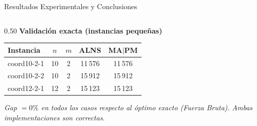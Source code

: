 \documentclass[aspectratio=169,10pt]{beamer}
\begin{document}
\begin{frame}{Resultados Experimentales y Conclusiones}
  \begin{columns}[T,onlytextwidth]
    \begin{column}{0.50\textwidth}
      \textbf{Validación exacta (instancias pequeñas)}
      \vspace{0.25em}
      \begin{center}\footnotesize
      \begin{tabular}{lcccc}
        \toprule
        Instancia & $n$ & $m$ & ALNS & MA$|$PM \\
        \midrule
        coord10-2-1 & 10 & 2
          & \cellcolor{green!20}11\,576
          & \cellcolor{green!20}11\,576 \\
        coord10-2-2 & 10 & 2
          & \cellcolor{green!20}15\,912
          & \cellcolor{green!20}15\,912 \\
        coord12-2-1 & 12 & 2
          & \cellcolor{green!20}15\,123
          & \cellcolor{green!20}15\,123 \\
        \bottomrule
      \end{tabular}
      \end{center}
      {\footnotesize\textit{Gap $= 0\%$ en todos los casos respecto al óptimo exacto
      (Fuerza Bruta). Ambas implementaciones son correctas.}}
      \vspace{0.1em}


\end{column}
\end{columns}
\end{frame}
\end{document}
